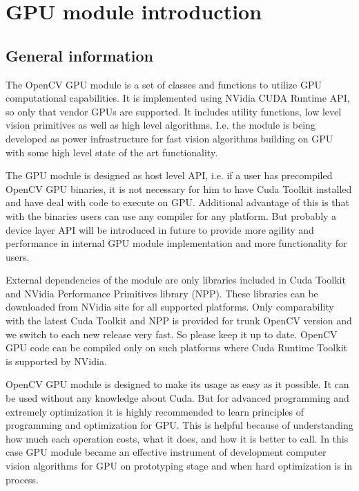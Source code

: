 \section {GPU module introduction}

\subsection{General information}

The OpenCV GPU module is a set of classes and functions to utilize GPU computational capabilities. It is implemented using NVidia CUDA Runtime API, so only that vendor GPUs are supported. It includes utility functions, low level vision primitives as well as high level algorithms. I.e. the module is being developed as power infrastructure for fast vision algorithms building on GPU with some high level state of the art functionality.  

The GPU module is designed as host level API, i.e. if a user has precompiled OpenCV GPU binaries, it is not necessary for him to have Cuda Toolkit installed and have deal with code to execute on GPU. Additional advantage of this is that with the binaries users can use any compiler for any platform. But probably a device layer API will be introduced in future to provide more agility and performance in internal GPU module implementation and more functionality for users.

External dependencies of the module are only libraries included in Cuda Toolkit and NVidia Performance Primitives library (NPP). These libraries can be downloaded from NVidia site for all supported platforms. Only comparability with the latest Cuda Toolkit and NPP is provided for trunk OpenCV version and we switch to each new release very fast. So please keep it up to date. OpenCV GPU code can be compiled only on such platforms where Cuda Runtime Toolkit is supported by NVidia.

OpenCV GPU module is designed to make its usage as easy as it possible. It can be used without any knowledge about Cuda. But for advanced programming and extremely optimization it is highly recommended to learn principles of programming and optimization for GPU. This is helpful because of understanding how much each operation costs, what it does, and how it is better to call. In this case GPU module became an effective instrument of development computer vision algorithms for GPU on prototyping stage and when hard optimization is in process.

